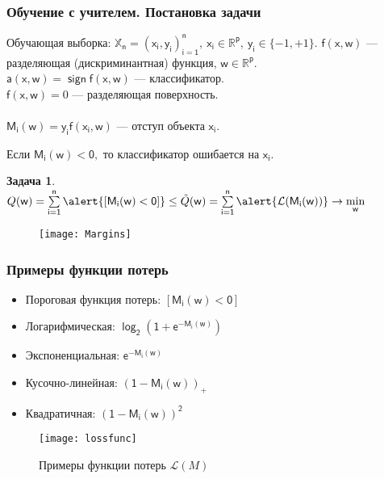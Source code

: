 \documentclass[unicode, notheorems]{beamer}
\newtheorem{task}{Задача}
\DeclareMathOperator{\sign}{sign}
\begin{document}
\begin{frame}
\frametitle{Обучение с учителем. Постановка задачи}
Обучающая выборка: $\mathbb{X}_\mathsf{n}=\mathsf{(x_i,y_i)_{i=1}^n},~\mathsf{x_i}\in \mathbb{R}^\mathsf{p},~ \mathsf{y_i}\in \{-1,+1\}.$
$\mathsf{f(x,w)}$ --- разделяющая (дискриминантная) функция, $\mathsf{w}\in\mathbb{R}^\mathsf{p}$. \\

$\mathsf{a(x,w)=\sign f(x,w)}$ --- классификатор. \\

$\mathsf{f(x,w)}=0$ --- разделяющая поверхность. \\
~~\\

$\mathsf{M_i(w)=y_if(x_i,w)}$ --- \alert{отступ} объекта $\mathsf{x_i}$. 

Если $\mathsf{M_i(w)<0},$ то классификатор ошибается на $\mathsf{x_i}$.
\begin{task}
	$Q(\mathsf{w)=\sum \limits_{i=1}^n \alert{[M_i(w)<0]}}\le \tilde Q(\mathsf{w)=\sum \limits_{i=1}^n \alert{\mathcal{L}(M_i(w))} \to \min \limits_{w}}$
\end{task}
\begin{figure}[h]
	\begin{center}
		\begin{minipage}[h]{0.55\linewidth}
			\texttt{[image: Margins]}
			\caption{}
			\label{series_IRLS} %
		\end{minipage}
	\end{center}
\end{figure}
\end{frame}

\begin{frame}
	\frametitle{Примеры функции потерь}
	\begin{itemize}
	\item \alert{Пороговая функция потерь: $\mathsf{[M_i(w)<0]}$}\\
	\item Логарифмическая: $\mathsf{\log_2 (1+e^{-M_i(w)})}$  \\
	\item Экспоненциальная: $\mathsf{e^{-M_i(w)}}$  \\
	\item Кусочно-линейная: $\mathsf{(1-M_i(w))_{+}}$ \\
	\item Квадратичная: $\mathsf{(1-M_i(w))^2}$ 

	 \end{itemize}
\begin{figure}[h]
	\begin{center}
		\begin{minipage}[h]{0.555\linewidth}
			\texttt{[image: lossfunc]}
			\caption{Примеры функции потерь $\mathcal{L}(M)$}
			\label{series_IRLS} %
		\end{minipage}
	\end{center}
\end{figure}

\end{frame}
\end{document}
